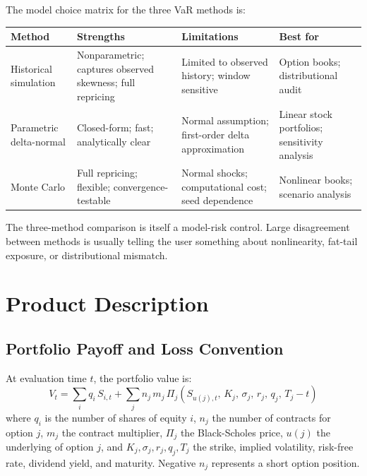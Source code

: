 \documentclass[11pt]{article}
\begin{document}
The model choice matrix for the three VaR methods is:

\begin{center}
\small
\begin{tabular}{L{2.8cm}L{4cm}L{4cm}L{3cm}}
\toprule
\textbf{Method} & \textbf{Strengths} & \textbf{Limitations} & \textbf{Best for} \\
\midrule
Historical simulation
  & Nonparametric; captures observed skewness; full repricing
  & Limited to observed history; window sensitive
  & Option books; distributional audit \\[4pt]
Parametric delta-normal
  & Closed-form; fast; analytically clear
  & Normal assumption; first-order delta approximation
  & Linear stock portfolios; sensitivity analysis \\[4pt]
Monte Carlo
  & Full repricing; flexible; convergence-testable
  & Normal shocks; computational cost; seed dependence
  & Nonlinear books; scenario analysis \\
\bottomrule
\end{tabular}
\end{center}

The three-method comparison is itself a model-risk control.  Large
disagreement between methods is usually telling the user something about
nonlinearity, fat-tail exposure, or distributional mismatch.

\section{Product Description}
\label{sec:product}

\subsection{Portfolio Payoff and Loss Convention}

At evaluation time $t$, the portfolio value is:
\begin{equation}
  V_t = \sum_{i} q_i\, S_{i,t}
      + \sum_{j} n_j\, m_j\,
        \Pi_j\!\left(S_{u(j),t},\, K_j,\, \sigma_j,\, r_j,\, q_j,\, T_j - t\right)
  \label{eq:portfolio_value}
\end{equation}
where $q_i$ is the number of shares of equity $i$, $n_j$ the number of
contracts for option $j$, $m_j$ the contract multiplier, $\Pi_j$ the
Black-Scholes price, $u(j)$ the underlying of option $j$, and
$K_j,\sigma_j,r_j,q_j,T_j$ the strike, implied volatility, risk-free
rate, dividend yield, and maturity.  Negative $n_j$ represents a short
option position.
\end{document}
